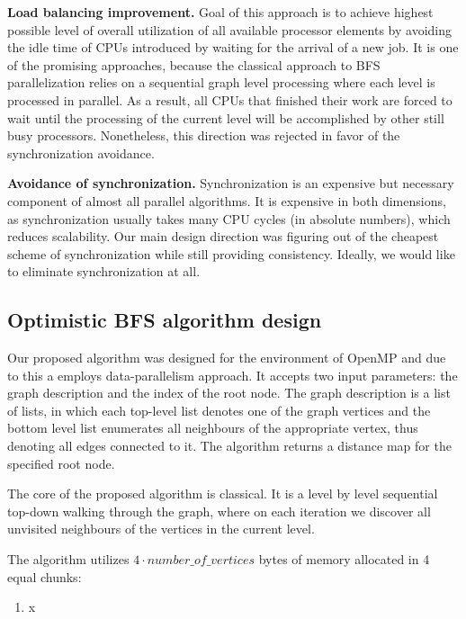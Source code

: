 \documentclass[letterpaper]{article}
\begin{document}
			\textbf{Load balancing improvement.} 
			Goal of this approach is to achieve highest possible level of overall utilization of all available processor elements by avoiding the idle time of CPUs introduced by waiting for the arrival of a new job.
			It is one of the promising approaches, because the classical approach to BFS parallelization relies on a sequential graph level processing where each level is processed in parallel.
			As a result, all CPUs that finished their work are forced to wait until the processing of the current level will be accomplished by other still busy processors.
			Nonetheless, this direction was rejected in favor of the synchronization avoidance. 
			
			\textbf{Avoidance of synchronization.}
			Synchronization is an expensive but necessary component of almost all parallel algorithms.
			It is expensive in both dimensions, as synchronization usually takes many CPU cycles (in absolute numbers), which reduces scalability. %
			Our main design direction was figuring out of the cheapest scheme of synchronization while still providing consistency.
			Ideally, we would like to eliminate synchronization at all.
			
		\subsection{Optimistic BFS algorithm design}
			Our proposed algorithm was designed for the environment of OpenMP and due to this a employs data-parallelism approach. 
			It accepts two input parameters: the graph description and the index of the root node.
			The graph description is a list of lists, in which each top-level list denotes one of the graph vertices and the bottom level list enumerates all neighbours of the appropriate vertex, thus denoting all edges connected to it.
			The algorithm returns a distance map for the specified root node.
			
			The core of the proposed algorithm is classical. 
			It is a level by level sequential top-down walking through the graph, where on each iteration we discover all unvisited neighbours of the vertices in the current level.
			
			The algorithm utilizes $4 \cdot number\_of\_vertices$ bytes of memory allocated in 4 equal chunks:
			\begin{enumerate}
				\item x
			\end{enumerate}
			
\end{document}
